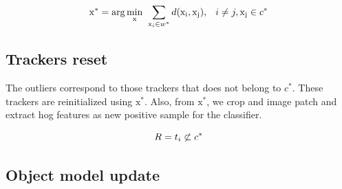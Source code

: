 \begin{equation}
\large
\mathrm{x}^{*} = \arg\min_{\mathrm{x}} ~\sum_{\mathrm{x}_{i} \in w^{*}}d(\mathrm{x_{i}}, \mathrm{x_{j}}) ,~~ i \neq j, \mathrm{x_{j}}\in c^{*}
\end{equation}

\subsection{Trackers reset}

The outliers correspond to those trackers that does not belong to $c^*$. These trackers are reinitialized using $\mathrm{x}^{*}$. Also, from $\mathrm{x}^{*}$, we crop and image patch and extract hog features as new positive sample for the classifier.

\begin{equation}
\large
R = t_i \not\subset c^*
\end{equation}

\subsection{Object model update}
